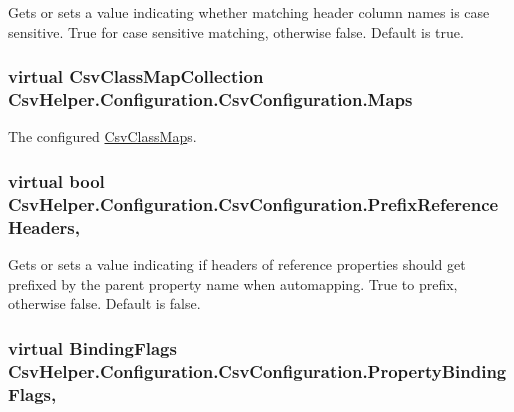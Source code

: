 Gets or sets a value indicating whether matching header column names is case sensitive. True for case sensitive matching, otherwise false. Default is true. 

\hypertarget{a00043_a9119c99f5dafba985718f631f7bfa16a}{
\subsubsection[{Maps}]{\setlength{\rightskip}{0pt plus 5cm}virtual {\bf Csv\-Class\-Map\-Collection} Csv\-Helper.\-Configuration.\-Csv\-Configuration.\-Maps\hspace{0.3cm}{\ttfamily [get]}}}\label{a00043_a9119c99f5dafba985718f631f7bfa16a}


The configured \hyperlink{a00040}{Csv\-Class\-Map}s. 

\hypertarget{a00043_aa4ec3b1cbc0dd97e69b0b7cf7225c2e9}{
\subsubsection[{Prefix\-Reference\-Headers}]{\setlength{\rightskip}{0pt plus 5cm}virtual bool Csv\-Helper.\-Configuration.\-Csv\-Configuration.\-Prefix\-Reference\-Headers\hspace{0.3cm}{\ttfamily [get]}, {\ttfamily [set]}}}\label{a00043_aa4ec3b1cbc0dd97e69b0b7cf7225c2e9}


Gets or sets a value indicating if headers of reference properties should get prefixed by the parent property name when automapping. True to prefix, otherwise false. Default is false. 

\hypertarget{a00043_ab5bd1a14758b0c6b84ca3544784a18dd}{
\subsubsection[{Property\-Binding\-Flags}]{\setlength{\rightskip}{0pt plus 5cm}virtual Binding\-Flags Csv\-Helper.\-Configuration.\-Csv\-Configuration.\-Property\-Binding\-Flags\hspace{0.3cm}{\ttfamily [get]}, {\ttfamily [set]}}}\label{a00043_ab5bd1a14758b0c6b84ca3544784a18dd}


